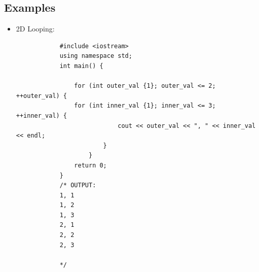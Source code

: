 \subsection{Examples}
\begin{itemize}
    \item 2D Looping:
        \begin{verbatim}
            #include <iostream>
            using namespace std;
            int main() {

                for (int outer_val {1}; outer_val <= 2; ++outer_val) {
                for (int inner_val {1}; inner_val <= 3; ++inner_val) {
                            cout << outer_val << ", " << inner_val << endl;
                        }
                    }
                return 0;
            }
            /* OUTPUT:
            1, 1
            1, 2
            1, 3
            2, 1
            2, 2
            2, 3

            */
        \end{verbatim}
    

\end{itemize}
